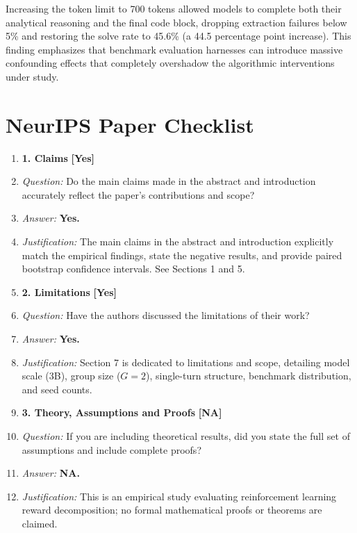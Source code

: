 \documentclass{article}
\begin{document}
Increasing the token limit to 700 tokens allowed models to complete both their analytical reasoning and the final code block, dropping extraction failures below 5\% and restoring the solve rate to 45.6\% (a 44.5 percentage point increase). This finding emphasizes that benchmark evaluation harnesses can introduce massive confounding effects that completely overshadow the algorithmic interventions under study.

\clearpage
\section{NeurIPS Paper Checklist}
\label{app:checklist}

\begin{enumerate}

\item[] \textbf{1. Claims} \hfill \textbf{[Yes]}
\item[] \textit{Question:} Do the main claims made in the abstract and introduction accurately reflect the paper's contributions and scope?
\item[] \textit{Answer:} \textbf{Yes.}
\item[] \textit{Justification:} The main claims in the abstract and introduction explicitly match the empirical findings, state the negative results, and provide paired bootstrap confidence intervals. See Sections 1 and 5.

\item[] \textbf{2. Limitations} \hfill \textbf{[Yes]}
\item[] \textit{Question:} Have the authors discussed the limitations of their work?
\item[] \textit{Answer:} \textbf{Yes.}
\item[] \textit{Justification:} Section 7 is dedicated to limitations and scope, detailing model scale (3B), group size ($G=2$), single-turn structure, benchmark distribution, and seed counts.

\item[] \textbf{3. Theory, Assumptions and Proofs} \hfill \textbf{[NA]}
\item[] \textit{Question:} If you are including theoretical results, did you state the full set of assumptions and include complete proofs?
\item[] \textit{Answer:} \textbf{NA.}
\item[] \textit{Justification:} This is an empirical study evaluating reinforcement learning reward decomposition; no formal mathematical proofs or theorems are claimed.


\end{enumerate}
\end{document}
